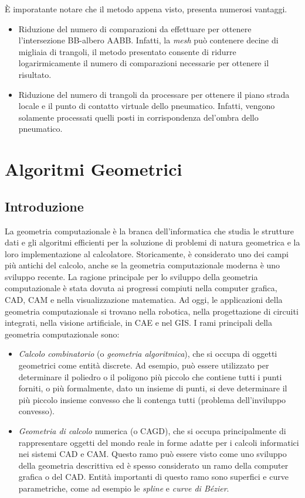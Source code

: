 È imporatante notare che il metodo appena visto, presenta numerosi vantaggi.
\begin{itemize}
	\item Riduzione del numero di comparazioni da effettuare per ottenere l'intersezione \ac{BB}-albero \ac{AABB}. Infatti, la \textit{mesh} può contenere decine di migliaia di trangoli, il metodo presentato consente di ridurre logarirmicamente il numero di comparazioni necessarie per ottenere il risultato.
	\item Riduzione del numero di trangoli da processare per ottenere il piano strada locale e il punto di contatto virtuale dello pneumatico. Infatti, vengono solamente processati quelli posti in corrispondenza del'ombra dello pneumatico.
\end{itemize}
%
\section{Algoritmi Geometrici}
%
\subsection{Introduzione}
La geometria computazionale è la branca dell'informatica che studia le strutture dati e gli algoritmi efficienti per la soluzione di problemi di natura geometrica e la loro implementazione al calcolatore. Storicamente, è considerato uno dei campi più antichi del calcolo, anche se la geometria computazionale moderna è uno sviluppo recente. La ragione principale per lo sviluppo della geometria computazionale è stata dovuta ai progressi compiuti nella computer grafica, \ac{CAD}, \ac{CAM} e nella visualizzazione matematica. Ad oggi, le applicazioni della geometria computazionale si trovano nella robotica, nella progettazione di circuiti integrati, nella visione artificiale, in \ac{CAE} e nel \ac{GIS}. I rami principali della geometria computazionale sono:
\begin{itemize}
	\item \textit{Calcolo combinatorio} (o \textit{geometria algoritmica}), che si occupa di oggetti geometrici come entità discrete. Ad esempio, può essere utilizzato per determinare il poliedro o il poligono più piccolo che contiene tutti i punti forniti, o più formalmente, dato un insieme di punti, si deve determinare il più piccolo insieme convesso che li contenga tutti (problema dell'inviluppo convesso).
	\item \textit{Geometria di calcolo} numerica (o \ac{CAGD}), che si occupa principalmente di rappresentare oggetti del mondo reale in forme adatte per i calcoli informatici nei sistemi \ac{CAD} e \ac{CAM}. Questo ramo può essere visto come uno sviluppo della geometria descrittiva ed è spesso considerato un ramo della computer grafica o del \ac{CAD}. Entità importanti di questo ramo sono superfici e curve parametriche, come ad esempio le \textit{spline} e \textit{curve di Bézier}.
\end{itemize}

